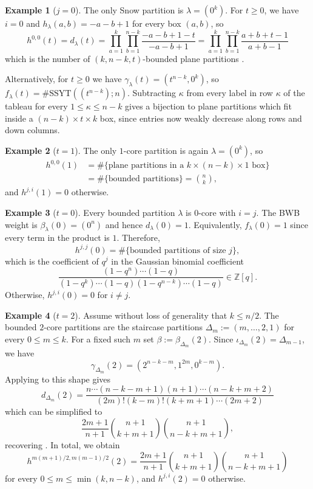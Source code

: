 \documentclass{amsart}
\newcommand\SSYT{\mathrm{SSYT}}
\newcommand\Z{\mathbb{Z}}
\theoremstyle{plain}
\theoremstyle{definition}
\newtheorem{example}[example]{Example}
\numberwithin{equation}{section}
\begin{document}
\begin{example}[$j=0$]
The only Snow partition is $\lambda=(0^k)$. For $t\geq 0$, we have $i=0$ and $h_\lambda(a,b)=-a-b+1$ for every box $(a,b)$, so
\[h^{0,0}(t)=d_\lambda(t)=\prod_{a=1}^k\prod_{b=1}^{n-k}\frac{-a-b+1-t}{-a-b+1}=\prod_{a=1}^k\prod_{b=1}^{n-k}\frac{a+b+t-1}{a+b-1}\]
which is the number of $(k,n-k,t)$-bounded plane partitions \cite{Mac86}.

Alternatively, for $t\geq 0$ we have $\gamma_\lambda(t)=(t^{n-k},0^k)$, so $f_\lambda(t)=\#\SSYT((t^{n-k});n)$. Subtracting $\kappa$ from every label in row $\kappa$ of the tableau for every $1\leq \kappa\leq n-k$ gives a bijection to plane partitions which fit inside a $(n-k)\times t\times k$ box, since entries now weakly decrease along rows and down columns.

\label{ex: Macmahon}
\end{example}

\begin{example}[$t=1$]
The only $1$-core partition is again $\lambda=(0^k)$, so
\begin{align*}h^{0,0}(1)&=\#\{\text{plane partitions in a $k\times(n-k)\times 1$ box}\}\\
&=\#\{\text{bounded partitions}\}=\binom{n}{k},\end{align*}
and $h^{j,i}(1)=0$ otherwise.
\end{example}

\begin{example}[$t=0$]
    \label{ex:t=0}
Every bounded partition $\lambda$ is $0$-core with $i=j$. The BWB weight is $\beta_\lambda(0)=(0^n)$ and hence $d_\lambda(0)=1$. Equivalently, $f_\lambda(0)=1$ since every term in the product is $1$. Therefore,
\[h^{j,j}(0)=\#\{\text{bounded partitions of size $j$}\},\]
which is the coefficient of $q^j$ in the Gaussian binomial coefficient
\[\frac{(1-q^n)\cdots(1-q)}{(1-q^k)\cdots (1-q)(1-q^{n-k})\cdots(1-q)}\in\Z[q].\]
Otherwise, $h^{j,i}(0)=0$ for $i\neq j$.
\end{example}

\begin{example}[$t=2$]
    \label{ex:t=2}
Assume without loss of generality that $k\leq n/2$. The bounded $2$-core partitions are the staircase partitions $\Delta_m:=(m,\dots,2,1)$ for every $0\leq m\leq k$. For a fixed such $m$ set $\beta:=\beta_{\Delta_m}(2)$. Since $\iota_{\Delta_m}(2)=\Delta_{m-1}$, we have
\[\gamma_{\Delta_m}(2)=(2^{n-k-m},1^{2m},0^{k-m}).\]
Applying  to this shape gives
\[d_{\Delta_m}(2)=\frac{n\cdots(n-k-m+1)(n+1)\cdots(n-k+m+2)}{(2m)!(k-m)!(k+m+1)\cdots(2m+2)}\]
which can be simplified to
\[\frac{2m+1}{n+1}\binom{n+1}{k+m+1}\binom{n+1}{n-k+m+1},\]
recovering \cite[Theorem 3.3]{Sno86}. In total, we obtain
\[h^{m(m+1)/2,m(m-1)/2}(2)=\frac{2m+1}{n+1}\binom{n+1}{k+m+1}\binom{n+1}{n-k+m+1}\]
for every $0\leq m\leq \min(k,n-k)$, and $h^{j,i}(2)=0$ otherwise.
\end{example}
\end{document}

